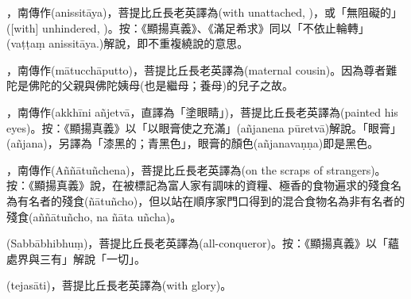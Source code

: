 \startitemgroup[noteitems]
\item{}，南傳作(anissitāya)，菩提比丘長老英譯為(with unattached, )，或「無阻礙的」([with] unhindered, )。按：《顯揚真義》、《滿足希求》同以「不依止輪轉」(vaṭṭaṃ anissitāya.)解說，即不重複繞說的意思。
\stopitemgroup

\startitemgroup[noteitems]
\item{}，南傳作(mātucchāputto)，菩提比丘長老英譯為(maternal cousin)。因為尊者難陀是佛陀的父親與佛陀姨母(也是繼母；養母)的兒子之故。
\stopitemgroup

\startitemgroup[noteitems]
\item{}，南傳作(akkhīni añjetvā，直譯為「塗眼睛」)，菩提比丘長老英譯為(painted his eyes)。按：《顯揚真義》以「以眼膏使之充滿」(añjanena pūretvā)解說。「眼膏」(añjana)，另譯為「漆黑的；青黑色」，眼膏的顏色(añjanavaṇṇa)即是黑色。
\stopitemgroup

\startitemgroup[noteitems]
\item{}，南傳作(Aññātuñchena)，菩提比丘長老英譯為(on the scraps of strangers)。按：《顯揚真義》說，在被標記為富人家有調味的資糧、極香的食物遍求的殘食名為有名者的殘食(ñātuñcho)，但以站在順序家門口得到的混合食物名為非有名者的殘食(aññātuñcho, na ñāta uñcha)。
\stopitemgroup

\startitemgroup[noteitems]
\item{}(Sabbābhibhuṃ)，菩提比丘長老英譯為(all-conqueror)。按：《顯揚真義》以「蘊處界與三有」解說「一切」。
\stopitemgroup

\startitemgroup[noteitems]
\item{}(tejasāti)，菩提比丘長老英譯為(with glory)。
\stopitemgroup

